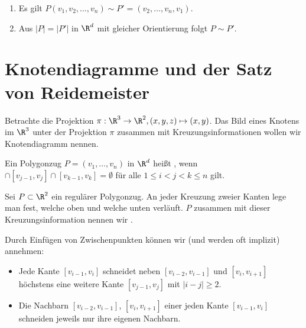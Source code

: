 \begin{nt}
    \begin{enumerate}[(1)]
        \item
            Es gilt $P(v_1, v_2, \dotsc, v_n) \sim P' = (v_2, \dotsc, v_n, v_1)$.
        \item
            Aus $|P| = |P'|$ in $\R^d$ mit gleicher Orientierung folgt $P \sim P'$.
    \end{enumerate}
\end{nt}


\section{Knotendiagramme und der Satz von Reidemeister}


Betrachte die Projektion $\pi: \R^3 \to \R^2, (x,y,z) \mapsto (x,y)$.
Das Bild eines Knotens im $\R^3$ unter der Projektion $\pi$ zusammen mit Kreuzungsinformationen wollen wir Knotendiagramm nennen.

\begin{df}
    Ein Polygonzug $P = (v_1, \dotsc, v_n)$ in $\R^d$ heißt , wenn
    \begin{math}
        [v_{i-1},v_i] \cap [v_{j-1},v_j] \cap [v_{k-1}, v_{k}] = \emptyset
    \end{math}
    für alle $1 \le i < j < k \le n$ gilt.
\end{df}

\begin{df}
    Sei $P \subset \R^2$ ein regulärer Polygonzug.
    An jeder Kreuzung zweier Kanten lege man fest, welche oben und welche unten verläuft.
    $P$ zusammen mit dieser Kreuzungsinformation nennen wir .
    \begin{note}
        Durch Einfügen von Zwischenpunkten können wir (und werden oft implizit) annehmen:
        \begin{itemize}
            \item
                Jede Kante $[v_{i-1}, v_i]$ schneidet neben $[v_{i-2}, v_{i-1}]$ und $[v_{i},v_{i+1}]$ höchstens eine weitere Kante $[v_{j-1},v_j]$ mit $|i-j| \ge 2$.
            \item
                Die Nachbarn $[v_{i-2}, v_{i-1}]$, $[v_i, v_{i+1}]$ einer jeden Kante $[v_{i-1}, v_i]$ schneiden jeweils nur ihre eigenen Nachbarn.
        \end{itemize}
    \end{note}
\end{df}

